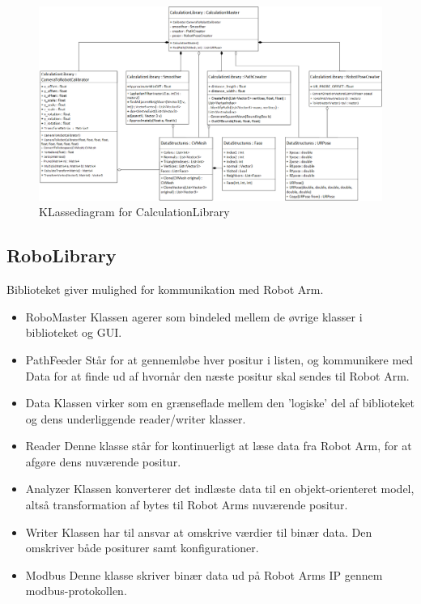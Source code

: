 \begin{figure}[H]
    \centering
    \includegraphics[width=1\textwidth]{figurer/d/Design/Class/uml_class_calculationlibrary}
    \caption{KLassediagram for CalculationLibrary}
    \label{class_ConversionLib}
\end{figure}
\newpage

\subsection{RoboLibrary}
Biblioteket giver mulighed for kommunikation med Robot Arm.

\begin{itemize}
\item{RoboMaster}\newline
Klassen agerer som bindeled mellem de øvrige klasser i biblioteket og GUI.

\item{PathFeeder} \newline
Står for at gennemløbe hver positur i listen, og kommunikere med Data for at finde ud af hvornår den næste positur skal sendes til Robot Arm.

\item{Data}\newline
Klassen virker som en grænseflade mellem den 'logiske' del af biblioteket og dens underliggende reader/writer klasser.

\item{Reader}\newline
Denne klasse står for kontinuerligt at læse data fra Robot Arm, for at afgøre dens nuværende positur. 

\item{Analyzer} \newline
Klassen konverterer det indlæste data til en objekt-orienteret model, altså transformation af bytes til Robot Arms nuværende positur.

\item{Writer}\newline
Klassen har til ansvar at omskrive værdier til binær data. Den omskriver både positurer samt konfigurationer.

\item{Modbus}\newline
Denne klasse skriver binær data ud på Robot Arms IP gennem modbus-protokollen.
\end{itemize}

